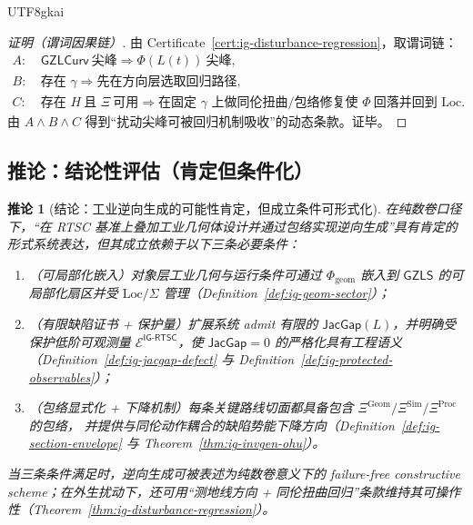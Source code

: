 \documentclass[12pt]{article}
\newtheorem{corollary}{推论}[section]
\newcommand{\GZLS}{\ensuremath{\mathsf{GZLS}}}
\newcommand{\GZLCurv}{\ensuremath{\mathsf{GZLCurv}}}
\newcommand{\JacGap}{\ensuremath{\mathsf{JacGap}}}
\newcommand{\RTSC}{\textsf{RTSC}}
\begin{document}
\begin{CJK*}{UTF8}{gkai}
\begin{proof}[证明（谓词因果链）]
由 Certificate~\ref{cert:ig-disturbance-regression}，取谓词链：
\[
\begin{aligned}
A:&\ \GZLCurv\ \text{尖峰}\Rightarrow \Phi(L(t))\ \text{尖峰},\\
B:&\ \text{存在 }\gamma\Rightarrow \text{先在方向层选取回归路径},\\
C:&\ \text{存在 }H\ \text{且 }\Xi\ \text{可用}\Rightarrow \text{在固定 }\gamma\text{ 上做同伦扭曲/包络修复使 }\Phi\ \text{回落并回到 }
  \mathrm{Loc}.
\end{aligned}
\]
由 $A\wedge B\wedge C$ 得到“扰动尖峰可被回归机制吸收”的动态条款。证毕。
\end{proof}

\subsection{推论：结论性评估（肯定但条件化）}

\begin{corollary}[结论：工业逆向生成的可能性肯定，但成立条件可形式化]
\label{cor:ig-conditional-yes}
在纯数卷口径下，“在 \RTSC{} 基准上叠加工业几何体设计并通过包络实现逆向生成”具有肯定的形式系统表达，但其成立依赖于以下三条必要条件：
\begin{enumerate}
  \item（可局部化嵌入）对象层工业几何与运行条件可通过 $\Phi_{\mathrm{geom}}$ 嵌入到 $\GZLS$ 的可局部化扇区并受 $\mathrm{Loc}/\Sigma$ 管理（Definition~\ref{def:ig-geom-sector}）；
  \item（有限缺陷证书 + 保护量）扩展系统 admit 有限的 $\JacGap(L)$，并明确受保护低阶可观测量 $\mathcal{E}^{\textsf{IG-RTSC}}$，使 $\JacGap=0$
    的严格化具有工程语义（Definition~\ref{def:ig-jacgap-defect} 与 Definition~\ref{def:ig-protected-observables}）；
  \item（包络显式化 + 下降机制）每条关键路线切面都具备包含 $\Xi^{\mathrm{Geom}}/\Xi^{\mathrm{Sim}}/\Xi^{\mathrm{Proc}}$ 的包络，
    并提供与同伦动作耦合的缺陷势能下降方向（Definition~\ref{def:ig-section-envelope} 与 Theorem~\ref{thm:ig-invgen-ohu}）。
\end{enumerate}
当三条条件满足时，逆向生成可被表述为纯数卷意义下的 failure-free constructive scheme；在外生扰动下，还可用“测地线方向 + 同伦扭曲回归”条款维持其可操作性（Theorem~\ref{thm:ig-disturbance-regression}）。
\end{corollary}


\end{CJK*}
\end{document}
